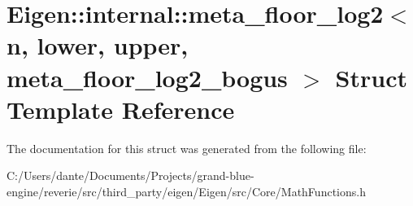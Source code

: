 \hypertarget{struct_eigen_1_1internal_1_1meta__floor__log2_3_01n_00_01lower_00_01upper_00_01meta__floor__log2__bogus_01_4}{}\section{Eigen\+::internal\+::meta\+\_\+floor\+\_\+log2$<$ n, lower, upper, meta\+\_\+floor\+\_\+log2\+\_\+bogus $>$ Struct Template Reference}
\label{struct_eigen_1_1internal_1_1meta__floor__log2_3_01n_00_01lower_00_01upper_00_01meta__floor__log2__bogus_01_4}


The documentation for this struct was generated from the following file\+:\begin{DoxyCompactItemize}
\item 
C\+:/\+Users/dante/\+Documents/\+Projects/grand-\/blue-\/engine/reverie/src/third\+\_\+party/eigen/\+Eigen/src/\+Core/Math\+Functions.\+h\end{DoxyCompactItemize}
